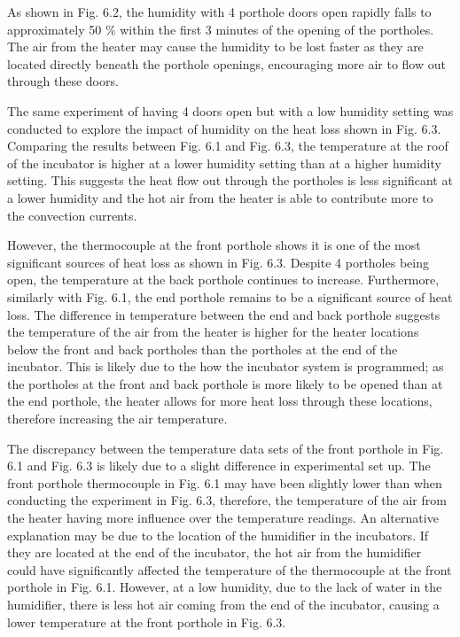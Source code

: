\documentclass{article}
\begin{document}
\vspace{3mm}

As shown in Fig. 6.2, the humidity with 4 porthole doors open rapidly falls to approximately 50 \% within the first 3 minutes of the opening of the portholes. The air from the heater may cause the humidity to be lost faster as they are located directly beneath the porthole openings, encouraging more air to flow out through these doors. 

\vspace{3mm}

The same experiment of having 4 doors open but with a low humidity setting was conducted to explore the impact of humidity on the heat loss shown in Fig. 6.3. Comparing the results between Fig. 6.1 and Fig. 6.3, the temperature at the roof of the incubator is higher at a lower humidity setting than at a higher humidity setting. This suggests the heat flow out through the portholes is less significant at a lower humidity and the hot air from the heater is able to contribute more to the convection currents. 

\vspace{3mm}

However, the thermocouple at the front porthole shows it is one of the most significant sources of heat loss as shown in Fig. 6.3. Despite 4 portholes being open, the temperature at the back porthole continues to increase. Furthermore, similarly with Fig. 6.1, the end porthole remains to be a significant source of heat loss. The difference in temperature between the end and back porthole suggests the temperature of the air from the heater is higher for the heater locations below the front and back portholes than the portholes at the end of the incubator. This is likely due to the how the incubator system is programmed; as the portholes at the front and back porthole is more likely to be opened than at the end porthole, the heater allows for more heat loss through these locations, therefore increasing the air temperature. 

\vspace{3mm}

The discrepancy between the temperature data sets of the front porthole in Fig. 6.1 and Fig. 6.3 is likely due to a slight difference in experimental set up. The front porthole thermocouple in Fig. 6.1 may have been slightly lower than when conducting the experiment in Fig. 6.3, therefore, the temperature of the air from the heater having more influence over the temperature readings. An alternative explanation may be due to the location of the humidifier in the incubators. If they are located at the end of the incubator, the hot air from the humidifier could have significantly affected the temperature of the thermocouple at the front porthole in Fig. 6.1. However, at a low humidity, due to the lack of water in the humidifier, there is less hot air coming from the end of the incubator, causing a lower temperature at the front porthole in Fig. 6.3.
\end{document}

